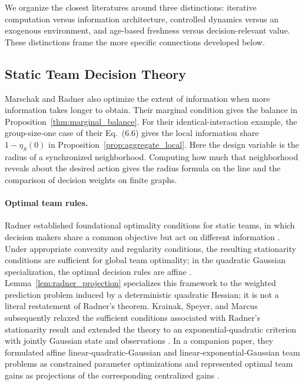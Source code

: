 \documentclass[11pt]{article}
\begin{document}
We organize the closest literatures around three distinctions: iterative
computation versus information architecture, controlled dynamics versus an
exogenous environment, and age-based freshness versus decision-relevant value.
These distinctions frame the more specific connections developed below.

\subsection{Static Team Decision Theory}
\label{subsec:related_static}

Marschak and Radner also optimize the extent of information when more
information takes longer to obtain. Their marginal condition
\cite[Ch.~7, Eq.~(6.5)]{marschak1972economic} gives the balance in
Proposition~\ref{thm:marginal_balance}. For their identical-interaction
example, the group-size-one case of their Eq.~(6.6) gives the local
information share $1-\eta_S(0)$ in
Proposition~\ref{prop:aggregate_local}. Here the design variable is the
radius of a synchronized neighborhood. Computing how much that
neighborhood reveals about the desired action gives the radius formula
on the line and the comparison of decision weights on finite graphs.

\paragraph{Optimal team rules.}
Radner established foundational optimality conditions for static teams, in which decision makers share a common objective but act on different information \cite{radner1962team}. Under appropriate convexity and regularity conditions, the resulting stationarity conditions are sufficient for global team optimality; in the quadratic Gaussian specialization, the optimal decision rules are affine \cite{radner1962team,marschak1972economic}. Lemma~\ref{lem:radner_projection} specializes this framework to the weighted
prediction problem induced by a deterministic quadratic Hessian; it is not a
literal restatement of Radner's theorem. Krainak, Speyer, and Marcus subsequently relaxed the sufficient conditions associated with Radner's stationarity result and extended the theory to an exponential-quadratic criterion with jointly Gaussian state and observations \cite{krainak1982staticI}. In a companion paper, they formulated affine linear-quadratic-Gaussian and linear-exponential-Gaussian team problems as constrained parameter optimizations and represented optimal team gains as projections of the corresponding centralized gains \cite{krainak1982staticII}.
\end{document}
